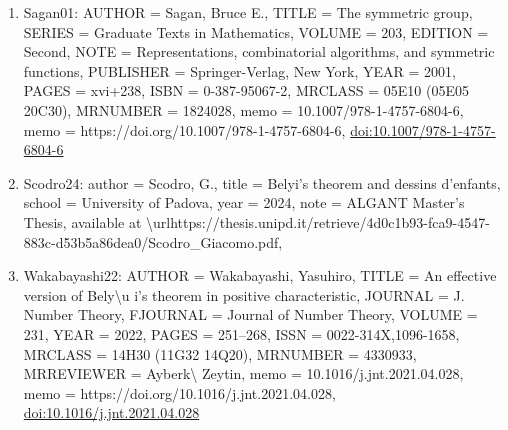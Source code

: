 \documentclass[11pt]{article}
\begin{document}
\begin{enumerate}[leftmargin=*]
  \item Sagan01: AUTHOR = Sagan, Bruce E., TITLE = The symmetric group, SERIES = Graduate Texts in Mathematics, VOLUME = 203, EDITION = Second, NOTE = Representations, combinatorial algorithms, and symmetric functions, PUBLISHER = Springer-Verlag, New York, YEAR = 2001, PAGES = xvi+238, ISBN = 0-387-95067-2, MRCLASS = 05E10 (05E05 20C30), MRNUMBER = 1824028, memo = 10.1007/978-1-4757-6804-6, memo = https://doi.org/10.1007/978-1-4757-6804-6, \href{https://doi.org/10.1007/978-1-4757-6804-6}{doi:10.1007/978-1-4757-6804-6}
  \item Scodro24: author = Scodro, G., title = Belyi's theorem and dessins d'enfants, school = University of Padova, year = 2024, note = ALGANT Master's Thesis, available at \textbackslash{}urlhttps://thesis.unipd.it/retrieve/4d0c1b93-fca9-4547-883c-d53b5a86dea0/Scodro\_Giacomo.pdf,
  \item Wakabayashi22: AUTHOR = Wakabayashi, Yasuhiro, TITLE = An effective version of Bely\textbackslash{}u i's theorem in positive characteristic, JOURNAL = J. Number Theory, FJOURNAL = Journal of Number Theory, VOLUME = 231, YEAR = 2022, PAGES = 251--268, ISSN = 0022-314X,1096-1658, MRCLASS = 14H30 (11G32 14Q20), MRNUMBER = 4330933, MRREVIEWER = Ayberk\textbackslash{} Zeytin, memo = 10.1016/j.jnt.2021.04.028, memo = https://doi.org/10.1016/j.jnt.2021.04.028, \href{https://doi.org/10.1016/j.jnt.2021.04.028}{doi:10.1016/j.jnt.2021.04.028}
\end{enumerate}

% 
% 
\end{document}

